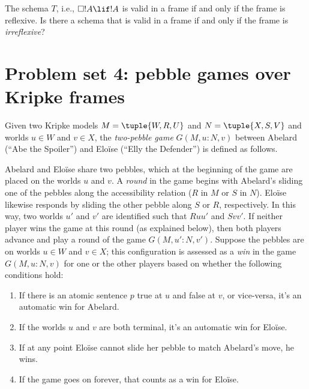 \documentclass[../../../include/open-logic-section]{subfiles}
\begin{document}
\begin{problem}  [15 points]
  The schema $T$, i.e., $\Box!A \lif !A$ is valid in a frame
  if and only if the frame is reflexive. Is there a schema that is
  valid in a frame if and only if the frame is \emph{irreflexive}?
\end{problem}







\section{Problem set 4: pebble games over Kripke frames}
\setcounter{problem}{0}



\begin{definition}
  Given two Kripke models ${M} = \tuple{W, R, U}$ and ${N} = \tuple{X,
    S, V}$ and worlds $u \in W$ and $v \in X$, the \emph{two-pebble
    game} $G({M}, u : {N}, v)$ between Abelard (``Abe the Spoiler'')
  and Elo\"ise (``Elly the Defender'') is defined as follows.

  Abelard and Elo\"ise share two pebbles, which at the beginning of
  the game are placed on the worlds $u$ and $v$.  A \emph{round} in
  the game begins with Abelard's sliding one of the pebbles along the
  accessibility relation ($R$ in ${M}$ or $S$ in ${N}$).  Elo\"ise
  likewise responds by sliding the other pebble along $S$ or $R$,
  respectively. In this way, two worlds $u'$ and $v'$ are identified
  such that $Ruu'$ and $Svv'$. If neither player wins the game at this
  round (as explained below), then both players advance and play a
  round of the game $G({M}, u' : {N}, v')$. Suppose the pebbles are on
  worlds $u \in W$ and $v\in X$; this configuration is assessed as a
  \emph{win} in the game $G({M}, u : {N}, v)$ for one or the other
  players based on whether the following conditions hold:
  \begin{enumerate}
  \item If there is an atomic sentence $p$ true at $u$ and false at
    $v$, or vice-versa, it's an automatic win for Abelard.
    \item If the worlds $u$ and $v$ are both terminal, it's an
      automatic win for Elo\"ise.
  \item If at any point Elo\"ise cannot slide her pebble to match
    Abelard's move, he wins.
  \item If the game goes on forever, that counts as a win for
    Elo\"ise. 
  \end{enumerate}
\end{definition}
 
\end{document}
